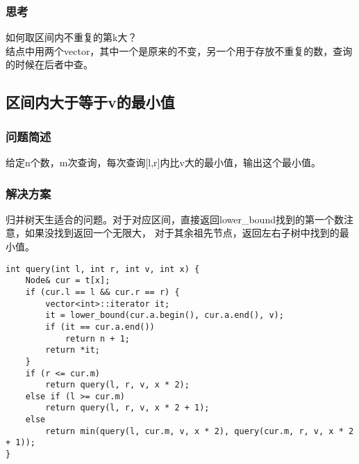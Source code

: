     \subsubsection{思考}
        如何取区间内不重复的第k大？\\
        结点中用两个vector，其中一个是原来的不变，另一个用于存放不重复的数，查询的时候在后者中查。

\subsection{区间内大于等于v的最小值}
    \subsubsection{问题简述}
        给定n个数，m次查询，每次查询[l,r]内比v大的最小值，输出这个最小值。
    \subsubsection{解决方案}
        归并树天生适合的问题。对于对应区间，直接返回lower\_bound找到的第一个数注意，如果没找到返回一个无限大，
        对于其余祖先节点，返回左右子树中找到的最小值。
\begin{lstlisting}
int query(int l, int r, int v, int x) {
    Node& cur = t[x];
    if (cur.l == l && cur.r == r) {
        vector<int>::iterator it;
        it = lower_bound(cur.a.begin(), cur.a.end(), v);
        if (it == cur.a.end())
            return n + 1;
        return *it;
    }
    if (r <= cur.m)
        return query(l, r, v, x * 2);
    else if (l >= cur.m)
        return query(l, r, v, x * 2 + 1);
    else
        return min(query(l, cur.m, v, x * 2), query(cur.m, r, v, x * 2 + 1));
}
\end{lstlisting}